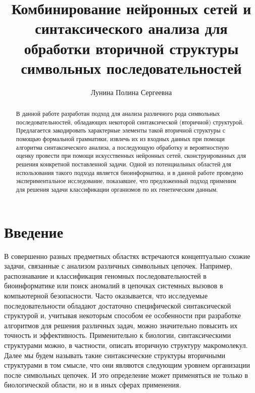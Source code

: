 \title{Комбинирование нейронных сетей и синтаксического анализа для обработки вторичной структуры символьных последовательностей}


\author{Лунина Полина Сергеевна}



\maketitle

\begin{abstract}
В данной работе разработан подход для анализа различного рода символьных последовательностей, обладающих некоторой синтаксической (вторичной) структурой. Предлагается закодировать характерные элементы такой вторичной структуры с помощью формальной грамматики, извлечь их из входных данных при помощи алгоритма синтаксического анализа, а последующую обработку и вероятностную оценку провести при помощи искусственных нейронных сетей, сконструированных для решения конкретной поставленной задачи. Одной из потенциальных областей для использования такого подхода является биоинформатика, и в данной работе проведено экспериментальное исследование, показавшее, что предложенный подход применим для решения задачи классификации организмов по их генетическим данным.
\end{abstract}

\section*{Введение}
В совершенно разных предметных областях встречаются концептуально схожие задачи, связанные с анализом различных символьных цепочек. Например, распознавание и классификация геномных последовательностей в биоинформатике или поиск аномалий в цепочках системных вызовов в компьютерной безопасности. Часто оказывается, что исследуемые последовательности обладают достаточно специфической синтаксической структурой и, учитывая некоторым способом ее особенности при разработке алгоритмов для решения различных задач, можно значительно повысить их точность и эффективность. Применительно к биологии, синтаксическими структурами можно, в частности, описать вторичную структуру макромолекул. Далее мы будем называть такие синтаксические структуры вторичными структурами в том смысле, что они являются следующим уровнем организации после символьных цепочек. И это определение может применяться не только в биологической области, но и в иных сферах применения.

